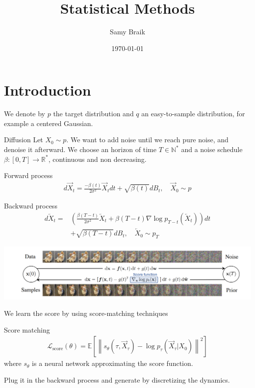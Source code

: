 \documentclass{beamer}
\title{Statistical Methods}
\author{Samy Braik}
\date{\today}
\begin{document}
\begin{frame}
    \titlepage
\end{frame}

\section{Introduction}

\begin{frame}
    We denote by \(p\) the target distribution and \(q\) an easy-to-sample distribution, for example a centered Gaussian.
\end{frame}

\begin{frame}{Diffusion}
    Let \(X_0\sim p\). We want to add noise until we reach pure noise, and denoise it afterward. We choose an horizon of time \(T\in\mathbb{N}^*\) and a noise schedule \(\beta:[0,T]\rightarrow\mathbb{R}^*\), continuous and non decreasing.

    \begin{block}{Forward process}
            \begin{align}
                d\overrightarrow{X}_t = \frac{-\beta(t)}{2\sigma^2}\overrightarrow{X}_t dt + \sqrt{\beta(t)}dB_t, \quad \overrightarrow{X}_0\sim p
            \end{align}
            \end{block}

    \begin{block}{Backward process}
        \begin{align}
            d\overleftarrow{X}_t=&\left(  \frac{\beta(T-t)}{2\sigma^2}\overleftarrow{X}_t+\beta(T-t)\nabla\log p_{T-t}\left(\overleftarrow{X}_t \right)  \right)dt \\ &+ \sqrt{\beta(T-t)}dB_t, \quad \overleftarrow{X}_0\sim p_T \nonumber
        \end{align}
            
    \end{block}
\end{frame}

\begin{frame}
    \includegraphics[width=1\linewidth]{score_based_dog.png}
    

    We learn the score by using score-matching techniques
    \begin{block}{Score matching}
        \begin{align}
            \mathcal{L}_\text{score}(\theta)=\mathbb{E}\left[ \left\| s_\theta \left(\tau,\overrightarrow{X}_\tau \right)-\log p_\tau \left(\overrightarrow{X}_\tau|X_0 \right)\right\|^2  \right]
        \end{align}
        where \(s_\theta\) is a neural network approximating the score function.
    \end{block}
    Plug it in the backward process and generate by discretizing the dynamics.
\end{frame}
\end{document}
